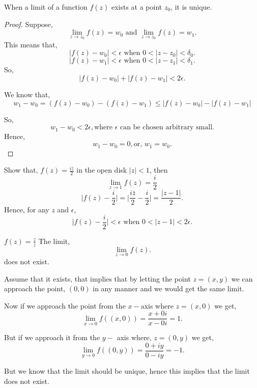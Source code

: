 \begin{theorem}
   When a limit of a function $f(z)$ exists at a point $z_0$, it is unique.
\end{theorem}
\begin{proof}
Suppose, \[
   \lim_{z \to z_0} f(z) = w_0 \text{ and } \lim_{z \to z_0} f(z) = w_1
.\]    
This means that, \[
   |f(z) - w_0| < \epsilon \text{ when } 0 < |z - z_0| < \delta_0
.\] 
\[
   |f(z) - w_1| < \epsilon \text{ when } 0 < |z - z_1| < \delta_1
.\] 
So, \[
|f(z) - w_0| + |f(z) - w_1| < 2\epsilon
.\] 

We know that, $$w_1 - w_0 = (f(z) - w_0) - (f(z) - w_1) \leq |f(z) - w_0| - |f(z) - w_1|$$

So, \[
   w_1 - w_0 < 2 \epsilon, \text{where $\epsilon$ can be chosen arbitrary small}
.\] 
Hence, \[
   w_1 - w_0 = 0, \text{or, } w_1 = w_0
.\] 
\end{proof}

\begin{eg}
   Show that, $f(z) = \frac{i\bar z}{2}$ in the open disk $|z| < 1$, then \[
   \lim_{z \to 1} f(z) = \frac{i}{2}
\]
\[
\bigg | f(z) - \frac{i}{2} \bigg | = \bigg | \frac{i \bar z}{2} - \frac{i}{2} \bigg | = \frac{|z - 1|}{2}
.\] 
Hence, for any $z$ and $\epsilon$, \[
   \bigg | f(z) - \frac{i}{2}| < \epsilon \text { when } 0 < |z - 1| < 2\epsilon
.\] 
\end{eg}

\begin{eg}
   $f(z) = \frac{z}{\bar z}$
   The limit, \[
   \lim_{z \to 0} f(z)
   .\] 
   does not exist.

   Assume that it exists, that implies that by letting the point $z = (x,y)$ we can approach the point,  $(0,0)$ in any manner and we would get the same limit. 
   
   Now if we approach the point from the  $x-$axis where  $z = (x,0)$ we get,  \[
   \lim_{x \to 0} f((x,0)) = \frac{x + 0i}{x - 0i} = 1
   .\] 

   But if we approach it from the $y-$ axis where,  $z = (0,y)$ we get,  \[
   \lim_{y \to 0} f((0,y)) = \frac{0 + iy}{0 - iy} = -1
   .\] 

   But we know that the limit should be unique, hence this implies that the limit does not exist.
\end{eg}

